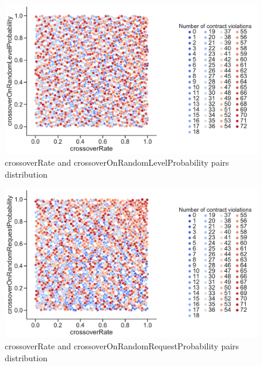 \begin{figure}
	\centering
	\includegraphics[width=\textwidth]{images/PairsDistr/crossoverRate_crossoverOnRandomLevelProbability.pdf}
	\caption[crossoverRate and crossoverOnRandomLevelProbability pairs distribution]{crossoverRate and crossoverOnRandomLevelProbability pairs distribution}
	\label{fig:crossoverRate_crossoverOnRandomLevelProbability_pair}
\end{figure}
\clearpage
\begin{figure}
	\centering
	\includegraphics[width=\textwidth]{images/PairsDistr/crossoverRate_crossoverOnRandomRequestProbability.pdf}
	\caption[crossoverRate and crossoverOnRandomRequestProbability pairs distribution]{crossoverRate and crossoverOnRandomRequestProbability pairs distribution}
	\label{fig:crossoverRate_crossoverOnRandomRequestProbability_pair}
\end{figure}
\clearpage
